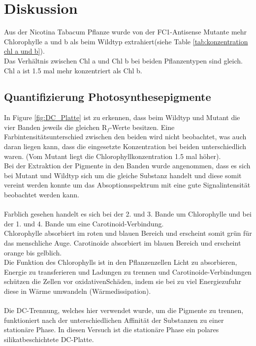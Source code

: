 \documentclass[10pt,a4paper]{article}
\begin{document}
	\section{Diskussion}
		Aus der Nicotina Tabacum Pflanze wurde von der FC1-Antisense Mutante mehr Chlorophylle a und b als beim Wildtyp extrahiert(siehe Table \ref{tab:konzentration chl a und b}).\\
		Das Verhältnis zwischen Chl a und Chl b bei beiden Pflanzentypen sind gleich. Chl a ist 1.5 mal mehr konzentriert als Chl b.\\
	
		
		\subsection{Quantifizierung Photosynthesepigmente}
			In Figure \ref{fig:DC_Platte} ist zu erkennen, dass beim Wildtyp und Mutant die vier Banden jeweils die gleichen R$_f$-Werte besitzen. Eine Farbintensitätsunterschied zwischen den beiden wird nicht beobachtet, was auch daran liegen kann, dass die eingesetzte Konzentration bei beiden unterschiedlich waren. (Vom Mutant liegt die Chlorophyllkonzentration 1.5 mal höher).\\
			Bei der Extraktion der Pigmente in den Banden wurde angenommen, dass es sich bei Mutant und Wildtyp sich um die gleiche Substanz handelt und diese somit vereint werden konnte um das Absoptionsspektrum mit eine gute Signalintensität beobachtet werden kann.\\
			\\
			Farblich gesehen handelt es sich bei der 2. und 3. Bande um Chlorophylle und bei der 1. und 4. Bande um eine Carotinoid-Verbindung.\\
			Chlorophylle absorbiert im roten und blauen Bereich und erscheint somit grün für das menschliche Auge. Carotinoide absorbiert im blauen Bereich und erscheint orange bis gelblich.\\
			Die Funktion des Chlorophylls ist in den Pflanzenzellen Licht zu absorbieren, Energie zu transferieren und Ladungen zu trennen und Carotinoide-Verbindungen schützen die Zellen vor oxidativenSchäden, indem sie bei zu viel Energiezufuhr diese in Wärme umwandeln (Wärmedissipation).\\
			\\
			Die DC-Trennung, welches hier verwendet wurde, um die Pigmente zu trennen, funktioniert nach der unterschiedlichen Affinität der Substanzen zu einer stationäre Phase. In diesen Versuch ist die stationäre Phase ein polares silikatbeschichtete DC-Platte.\\
\end{document}
